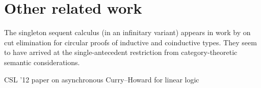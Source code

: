 


\section{Other related work}\label{sec:singleton-logic:related-work}

The singleton sequent calculus (in an infinitary variant) appears in work by \citeauthor{Fortier+Santocanale:CSL13} on cut elimination for circular proofs of inductive and coinductive types.\autocites{Santocanale:FOSSACS02}{Fortier+Santocanale:CSL13}
They seem to have arrived at the single-antecedent restriction from category-theoretic semantic considerations.

CSL '12 paper on asynchronous Curry--Howard for linear logic



